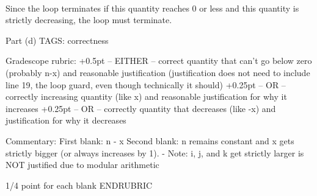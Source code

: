 \begin{parts}
\begin{framed}
\medskip
{}\else~\vspace{8ex}\fi

\smallskip
Since the loop terminates if this quantity
reaches 0 or less and this quantity is strictly decreasing, the loop must terminate.
\end{framed}

\RUBRIC
Part (d)
TAGS: correctness

Gradescope rubric:
+0.5pt  -- EITHER -- correct quantity that can't go below zero (probably n-x) and reasonable justification (justification does not need to include line 19, the loop guard, even though technically it should)
+0.25pt -- OR -- correctly increasing quantity (like x) and reasonable justification for why it increases
+0.25pt -- OR -- correctly quantity that decreases (like -x) and justification for why it decreases

Commentary:
First blank:  n - x
Second blank: n remains constant and x gets strictly bigger (or always increases by 1).
- Note: i, j, and k get strictly larger is NOT justified due to modular arithmetic

1/4 point for each blank
ENDRUBRIC

\end{parts}

